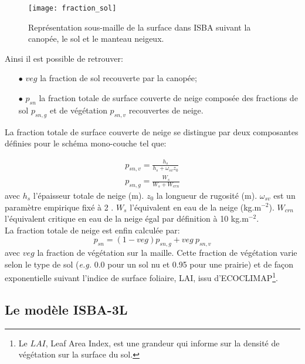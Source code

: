 \begin{figure}[h!]
\centering
\texttt{[image: fraction\_sol]}
\caption{Représentation sous-maille de la surface dans ISBA suivant la canopée, le sol et le manteau neigeux.}
\label{fraction_sol}
\end{figure}

\noindent Ainsi il est possible de retrouver:\\

\begin{itemize}
\item[$\bullet$] $veg$ la fraction de sol recouverte par la canopée;
\item[$\bullet$] $p_{sn}$ la fraction totale de surface couverte de neige composée des fractions de sol $p_{sn,g}$ et de végétation $p_{sn,v}$ recouvertes de neige.
\end{itemize}
\clearpage
\noindent La fraction totale de surface couverte de neige se distingue par deux composantes définies pour le schéma mono-couche tel que:

\begin{align}\label{eq:frac_snow}
p_{sn,v} = \frac{h_{s}}{h_{s}+\omega_{sv}z_{0}}\\
p_{sn,g} = \frac{W_{s}}{W_{s}+W_{crn}}
\end{align}
avec $h_{s}$ l'épaisseur totale de neige (m). $z_{0}$ la longueur de rugosité (m). $\omega_{sv}$ est un paramètre empirique fixé à 2 \citep{decharme2019}. $W_{s}$ l'équivalent en eau de la neige (kg.m$^{-2}$). $W_{crn}$ l'équivalent critique en eau de la neige égal par définition à 10 kg.m$^{-2}$.\\

\noindent La fraction totale de neige est enfin calculée par:
\begin{equation}
p_{sn} = (1-veg)p_{sn,g}+veg \: p_{sn,v}
\end{equation}
avec $veg$ la fraction de végétation sur la maille. Cette fraction de végétation varie selon le type de sol (\textit{e.g.} 0.0 pour un sol nu et 0.95 pour une prairie) et de façon exponentielle suivant l'indice de surface foliaire, LAI, issu d'ECOCLIMAP\footnote{Le $LAI$, Leaf Area Index, est une grandeur qui informe sur la densité de végétation sur la surface du sol.}.\\

\subsection{{\selectfont Le modèle ISBA-3L}}
\label{subsec:ISBA-3L}

